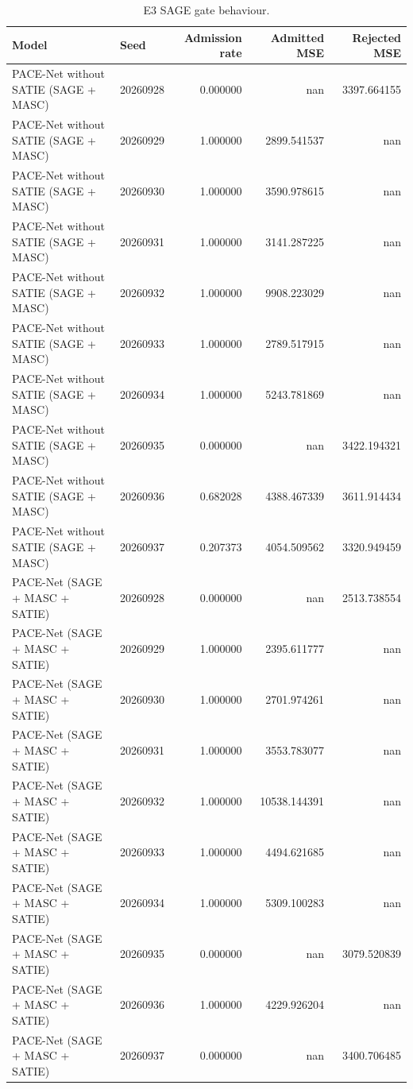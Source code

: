 \begin{table}[t]
\centering
\begin{tabular}{llrrr}
\hline
Model & Seed & Admission rate & Admitted MSE & Rejected MSE \\
\hline
PACE-Net without SATIE (SAGE + MASC) & 20260928 & 0.000000 & nan & 3397.664155 \\
PACE-Net without SATIE (SAGE + MASC) & 20260929 & 1.000000 & 2899.541537 & nan \\
PACE-Net without SATIE (SAGE + MASC) & 20260930 & 1.000000 & 3590.978615 & nan \\
PACE-Net without SATIE (SAGE + MASC) & 20260931 & 1.000000 & 3141.287225 & nan \\
PACE-Net without SATIE (SAGE + MASC) & 20260932 & 1.000000 & 9908.223029 & nan \\
PACE-Net without SATIE (SAGE + MASC) & 20260933 & 1.000000 & 2789.517915 & nan \\
PACE-Net without SATIE (SAGE + MASC) & 20260934 & 1.000000 & 5243.781869 & nan \\
PACE-Net without SATIE (SAGE + MASC) & 20260935 & 0.000000 & nan & 3422.194321 \\
PACE-Net without SATIE (SAGE + MASC) & 20260936 & 0.682028 & 4388.467339 & 3611.914434 \\
PACE-Net without SATIE (SAGE + MASC) & 20260937 & 0.207373 & 4054.509562 & 3320.949459 \\
PACE-Net (SAGE + MASC + SATIE) & 20260928 & 0.000000 & nan & 2513.738554 \\
PACE-Net (SAGE + MASC + SATIE) & 20260929 & 1.000000 & 2395.611777 & nan \\
PACE-Net (SAGE + MASC + SATIE) & 20260930 & 1.000000 & 2701.974261 & nan \\
PACE-Net (SAGE + MASC + SATIE) & 20260931 & 1.000000 & 3553.783077 & nan \\
PACE-Net (SAGE + MASC + SATIE) & 20260932 & 1.000000 & 10538.144391 & nan \\
PACE-Net (SAGE + MASC + SATIE) & 20260933 & 1.000000 & 4494.621685 & nan \\
PACE-Net (SAGE + MASC + SATIE) & 20260934 & 1.000000 & 5309.100283 & nan \\
PACE-Net (SAGE + MASC + SATIE) & 20260935 & 0.000000 & nan & 3079.520839 \\
PACE-Net (SAGE + MASC + SATIE) & 20260936 & 1.000000 & 4229.926204 & nan \\
PACE-Net (SAGE + MASC + SATIE) & 20260937 & 0.000000 & nan & 3400.706485 \\
\hline
\end{tabular}
\caption{E3 SAGE gate behaviour.}
\end{table}
